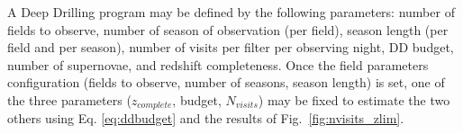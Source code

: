 \documentclass[skiphelvet,twocolumn]{lsstdescnote}
\newcommand{\zcomp}{\mbox{$z_{complete}$}}
\newcommand{\nvisits}{$N_{visits}$}
\begin{document}
A Deep Drilling program may be defined by the following parameters: number of fields to observe, number of season of observation (per field), season length (per field and per season),  number of visits per filter per observing night, DD budget, number of supernovae, and redshift completeness.  Once the field parameters configuration (fields to observe, number of seasons, season length) is set, one of the three parameters (\zcomp, budget, \nvisits) may be fixed to estimate the two others using Eq. \ref{eq:ddbudget} and the results of Fig.~\ref{fig:nvisits_zlim}. 

\end{document}
